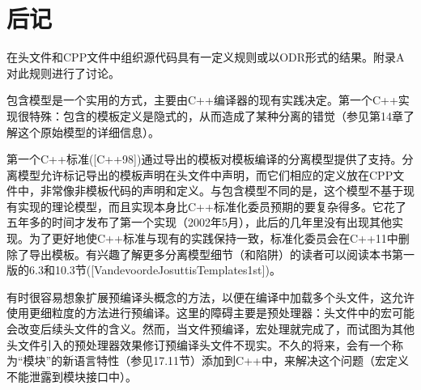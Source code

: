 \section{后记}
在头文件和CPP文件中组织源代码具有一定义规则或以ODR形式的结果。附录A对此规则进行了讨论。

包含模型是一个实用的方式，主要由C++编译器的现有实践决定。第一个C++实现很特殊：包含的模板定义是隐式的，从而造成了某种分离的错觉（参见第14章了解这个原始模型的详细信息）。

第一个C++标准([C++98])通过导出的模板对模板编译的分离模型提供了支持。分离模型允许标记导出的模板声明在头文件中声明，而它们相应的定义放在CPP文件中，非常像非模板代码的声明和定义。与包含模型不同的是，这个模型不基于现有实现的理论模型，而且实现本身比C++标准化委员预期的要复杂得多。它花了五年多的时间才发布了第一个实现（2002年5月），此后的几年里没有出现其他实现。为了更好地使C++标准与现有的实践保持一致，标准化委员会在C++11中删除了导出模板。有兴趣了解更多分离模型细节（和陷阱）的读者可以阅读本书第一版的6.3和10.3节([VandevoordeJosuttisTemplates1st])。

有时很容易想象扩展预编译头概念的方法，以便在编译中加载多个头文件，这允许使用更细粒度的方法进行预编译。这里的障碍主要是预处理器：头文件中的宏可能会改变后续头文件的含义。然而，当文件预编译，宏处理就完成了，而试图为其他头文件引入的预处理器效果修订预编译头文件不现实。不久的将来，会有一个称为“模块”的新语言特性（参见17.11节）添加到C++中，来解决这个问题（宏定义不能泄露到模块接口中）。